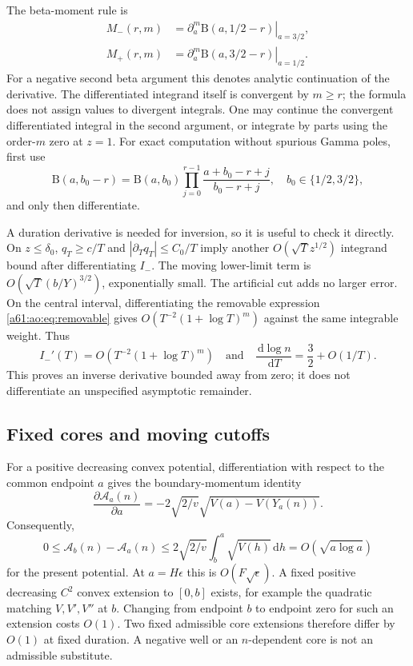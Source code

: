 \documentclass[11pt,letterpaper]{article}
\numberwithin{equation}{section}
\theoremstyle{remark}\newtheorem{remark}[theorem]{Remark}
\newcommand{\A}{\mathcal A}
\newcommand{\dd}{\,\mathrm d}
\begin{document}
The beta-moment rule is
\begin{align}
 M_-(r,m)&=\left.\partial_a^m\mathrm B(a,1/2-r)\right|_{a=3/2},
 \label{a61:ao:eq:betamoments}\\
 M_+(r,m)&=\left.\partial_a^m\mathrm B(a,3/2-r)\right|_{a=1/2}.
 \nonumber
\end{align}
For a negative second beta argument this denotes analytic continuation
of the derivative. The differentiated integrand itself is convergent
by $m\ge r$; the formula does not assign values to divergent
integrals. One may continue the convergent differentiated integral in
the second argument, or integrate by parts using the order-$m$ zero
at $z=1$. For exact computation without spurious Gamma poles, first use
\begin{equation}\label{a61:ao:eq:betarecurrence}
 \mathrm B(a,b_0-r)=\mathrm B(a,b_0)
 \prod_{j=0}^{r-1}\frac{a+b_0-r+j}{b_0-r+j},
 \quad b_0\in\{1/2,3/2\},
\end{equation}
and only then differentiate.

A duration derivative is needed for inversion, so it is useful to
check it directly. On $z\le\delta_0$,
$q_T\ge c/T$ and $|\partial_Tq_T|\le C_0/T$ imply another
$O(\sqrt Tz^{1/2})$ integrand bound after differentiating $I_-$.
The moving lower-limit term is
$O(\sqrt T(b/Y)^{3/2})$, exponentially small. The artificial cut adds
no larger error. On the central interval, differentiating the
removable expression \eqref{a61:ao:eq:removable} gives
$O(T^{-2}(1+\log T)^m)$ against the same integrable weight. Thus
\[
 I_-'(T)=O(T^{-2}(1+\log T)^m)
 \quad\text{and}\quad
 \frac{\dd\log n}{\dd T}=\frac32+O(1/T).
\]
This proves an inverse derivative bounded away from zero; it does not
differentiate an unspecified asymptotic remainder.

\subsection{Fixed cores and moving cutoffs}
For a positive decreasing convex potential, differentiation with
respect to the common endpoint $a$ gives the boundary-momentum identity
\[
 \frac{\partial\A_a(n)}{\partial a}
 =-2\sqrt{2/v}\sqrt{V(a)-V(Y_a(n))}.
\]
Consequently,
\[
 0\le\A_b(n)-\A_a(n)
 \le2\sqrt{2/v}\int_b^a\sqrt{V(h)}\dd h
 =O(\sqrt{a\log a})
\]
for the present potential. At $a=H\epsilon$ this is
$O(F\sqrt\epsilon)$. A fixed positive decreasing $C^2$ convex
extension to $[0,b]$ exists, for example the quadratic matching
$V,V',V''$ at $b$. Changing from endpoint $b$ to endpoint zero for
such an extension costs $O(1)$. Two fixed admissible core extensions
therefore differ by $O(1)$ at fixed duration. A negative well or an
$n$-dependent core is not an admissible substitute.
\end{document}

